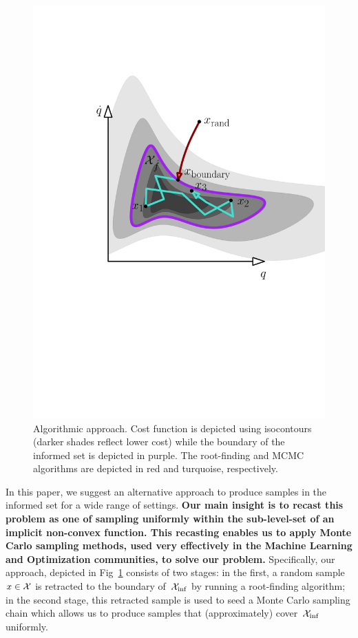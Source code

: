 \documentclass[letterpaper, 10 pt, conference]{ieeeconf}  %
\begin{document}
\begin{figure}[tb]
  \centering
  	\includegraphics[width=0.75\linewidth ]{fig/alg.pdf}
  \caption{
    \captionstyle
  	Algorithmic approach.
  	Cost function is depicted using isocontours (darker shades reflect lower cost) while the boundary of the informed set is depicted in purple. 
  	The root-finding and MCMC algorithms are depicted in red and turquoise, respectively.
  	}
   	\label{fig:alg}
\end{figure}


In this paper, we suggest an alternative approach to produce samples in the informed set \Cinf for a wide range of settings.
\textbf{
Our main insight is to recast this problem as one of sampling uniformly within the sub-level-set of an implicit non-convex function.
This recasting enables us to apply Monte Carlo sampling methods, used very effectively in the Machine Learning and Optimization communities, to solve our problem.
}
Specifically, our approach, depicted in Fig~\ref{fig:alg} consists of two stages:
in the first, a random sample $x \in \mathcal{X}$ is retracted to the boundary of~$\mathcal{X}_{\rm {inf}}$ by running a root-finding algorithm;
in the second stage, this retracted sample  is used to seed a Monte Carlo sampling chain which allows us to  produce samples that (approximately) cover~$\mathcal{X}_{\rm {inf}}$  uniformly.
\end{document}
